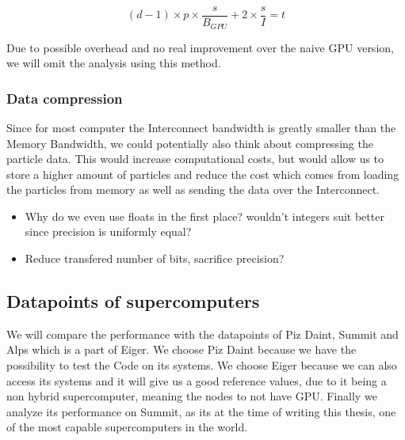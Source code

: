 \documentclass[]{article}
\begin{document}
\begin{center}
	\begin{equation}
		(d-1) \times p \times \frac{s}{B_{GPU}} + 2 \times \frac{s}{I} = t
		\label{eq:gpubatch}
	\end{equation}
\end{center}

Due to possible overhead and no real improvement over the naive GPU version, we will omit the analysis using this method.

\subsubsection{Data compression}

Since for most computer the Interconnect bandwidth is greatly smaller than the Memory Bandwidth, we could potentially also think about compressing the particle data. This would increase computational costs, but would allow us to store a higher amount of particles and reduce the cost which comes from loading the particles from memory as well as sending the data over the Interconnect.

\begin{itemize}
	\item Why do we even use floats in the first place? wouldn't integers suit better since precision is uniformly equal?
	\item Reduce transfered number of bits, sacrifice precision?
\end{itemize}

\subsection{Datapoints of supercomputers}

We will compare the performance with the datapoints of Piz Daint, Summit and Alps which is a part of Eiger. We choose Piz Daint because we have the possibility to test the Code on its systems. We choose Eiger because we can also access its systems and it will give us a good reference values, due to it being a non hybrid supercomputer, meaning the nodes to not have GPU. Finally we analyze its performance on Summit, as its at the time of writing this thesis, one of the most capable supercomputers in the world.
\end{document}
